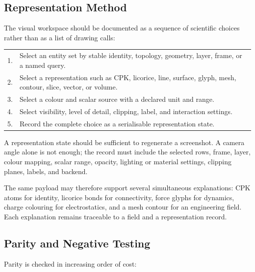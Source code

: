 \documentclass[11pt,a4paper]{article}
\begin{document}
\subsection{Representation Method}

The visual workspace should be documented as a sequence of scientific choices
rather than as a list of drawing calls:

\begin{center}
\small
\begin{tabular}{@{}p{0.5cm}p{14.0cm}@{}}
1. & Select an entity set by stable identity, topology, geometry, layer, frame,
     or a named query. \\
[0.25em]
2. & Select a representation such as CPK, licorice, line, surface, glyph,
     mesh, contour, slice, vector, or volume. \\
[0.25em]
3. & Select a colour and scalar source with a declared unit and range. \\
[0.25em]
4. & Select visibility, level of detail, clipping, label, and interaction
     settings. \\
[0.25em]
5. & Record the complete choice as a serialisable representation state. \\
\end{tabular}
\end{center}

A representation state should be sufficient to regenerate a screenshot.  A
camera angle alone is not enough; the record must include the selected rows,
frame, layer, colour mapping, scalar range, opacity, lighting or material
settings, clipping planes, labels, and backend.

The same payload may therefore support several simultaneous explanations:
CPK atoms for identity, licorice bonds for connectivity, force glyphs for
dynamics, charge colouring for electrostatics, and a mesh contour for an
engineering field.  Each explanation remains traceable to a field and a
representation record.

\subsection{Parity and Negative Testing}

Parity is checked in increasing order of cost:
\end{document}
